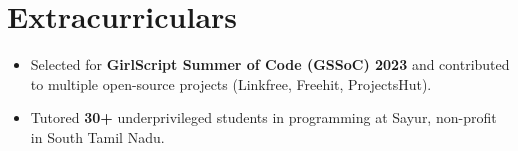 \documentclass[letterpaper,10pt]{article}
\begin{document}
\section{Extracurriculars}
\begin{itemize}[leftmargin=0.18in, itemsep=0pt, topsep=1pt]
  \item\small Selected for \textbf{GirlScript Summer of Code (GSSoC) 2023} and contributed to multiple open-source projects (Linkfree, Freehit, ProjectsHut).
  \item\small Tutored \textbf{30+} underprivileged students in programming at Sayur, non-profit in South Tamil Nadu.
\end{itemize}
\vspace{-6pt}
\end{document}
